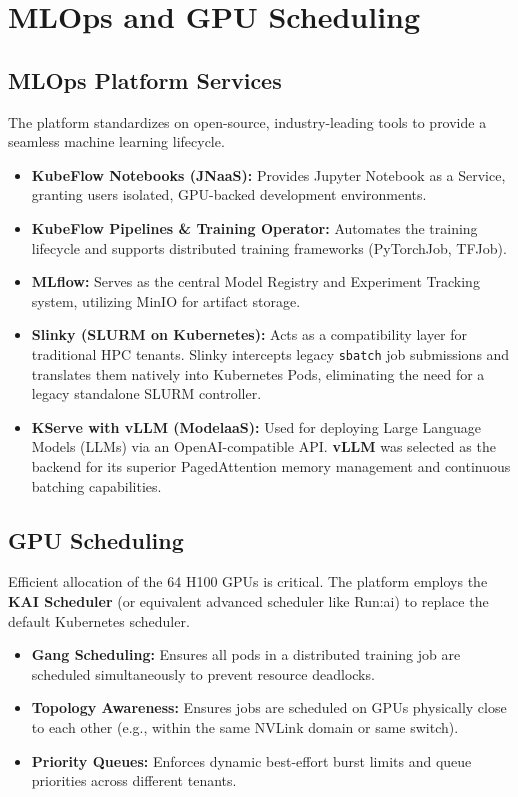 \chapter{MLOps and GPU Scheduling}

\section{MLOps Platform Services}
The platform standardizes on open-source, industry-leading tools to provide a seamless machine learning lifecycle.
\begin{itemize}
    \item \textbf{KubeFlow Notebooks (JNaaS):} Provides Jupyter Notebook as a Service, granting users isolated, GPU-backed development environments.
    \item \textbf{KubeFlow Pipelines \& Training Operator:} Automates the training lifecycle and supports distributed training frameworks (PyTorchJob, TFJob).
    \item \textbf{MLflow:} Serves as the central Model Registry and Experiment Tracking system, utilizing MinIO for artifact storage.
    \item \textbf{Slinky (SLURM on Kubernetes):} Acts as a compatibility layer for traditional HPC tenants. Slinky intercepts legacy \texttt{sbatch} job submissions and translates them natively into Kubernetes Pods, eliminating the need for a legacy standalone SLURM controller.
    \item \textbf{KServe with vLLM (ModelaaS):} Used for deploying Large Language Models (LLMs) via an OpenAI-compatible API. \textbf{vLLM} was selected as the backend for its superior PagedAttention memory management and continuous batching capabilities.
\end{itemize}

\section{GPU Scheduling}
Efficient allocation of the 64 H100 GPUs is critical. The platform employs the \textbf{KAI Scheduler} (or equivalent advanced scheduler like Run:ai) to replace the default Kubernetes scheduler.
\begin{itemize}
    \item \textbf{Gang Scheduling:} Ensures all pods in a distributed training job are scheduled simultaneously to prevent resource deadlocks.
    \item \textbf{Topology Awareness:} Ensures jobs are scheduled on GPUs physically close to each other (e.g., within the same NVLink domain or same switch).
    \item \textbf{Priority Queues:} Enforces dynamic best-effort burst limits and queue priorities across different tenants.
\end{itemize}

